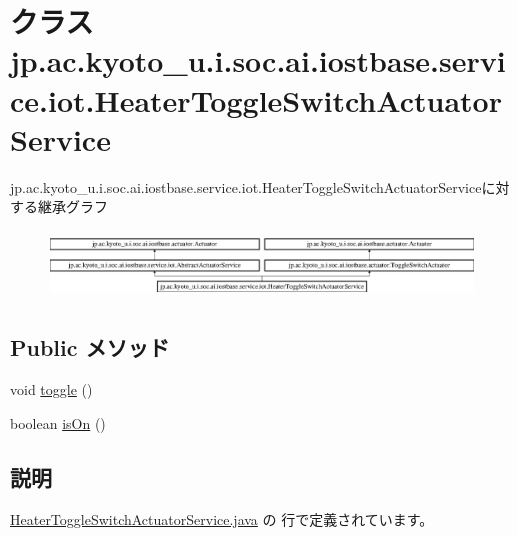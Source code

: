 \hypertarget{classjp_1_1ac_1_1kyoto__u_1_1i_1_1soc_1_1ai_1_1iostbase_1_1service_1_1iot_1_1_heater_toggle_switch_actuator_service}{\section{クラス jp.\-ac.\-kyoto\-\_\-u.\-i.\-soc.\-ai.\-iostbase.\-service.\-iot.\-Heater\-Toggle\-Switch\-Actuator\-Service}
\label{classjp_1_1ac_1_1kyoto__u_1_1i_1_1soc_1_1ai_1_1iostbase_1_1service_1_1iot_1_1_heater_toggle_switch_actuator_service}
}
jp.\-ac.\-kyoto\-\_\-u.\-i.\-soc.\-ai.\-iostbase.\-service.\-iot.\-Heater\-Toggle\-Switch\-Actuator\-Serviceに対する継承グラフ\begin{figure}[H]
\begin{center}
\leavevmode
\includegraphics[height=1.814255cm]{classjp_1_1ac_1_1kyoto__u_1_1i_1_1soc_1_1ai_1_1iostbase_1_1service_1_1iot_1_1_heater_toggle_switch_actuator_service}
\end{center}
\end{figure}
\subsection*{Public メソッド}
\begin{DoxyCompactItemize}
\item 
void \hyperlink{classjp_1_1ac_1_1kyoto__u_1_1i_1_1soc_1_1ai_1_1iostbase_1_1service_1_1iot_1_1_heater_toggle_switch_actuator_service_adffcf65040837298a560a912758f8cb4}{toggle} ()
\item 
boolean \hyperlink{classjp_1_1ac_1_1kyoto__u_1_1i_1_1soc_1_1ai_1_1iostbase_1_1service_1_1iot_1_1_heater_toggle_switch_actuator_service_a6722ed3b9d14f2e3588b917883c51988}{is\-On} ()
\end{DoxyCompactItemize}


\subsection{説明}


 \hyperlink{_heater_toggle_switch_actuator_service_8java_source}{Heater\-Toggle\-Switch\-Actuator\-Service.\-java} の  行で定義されています。



